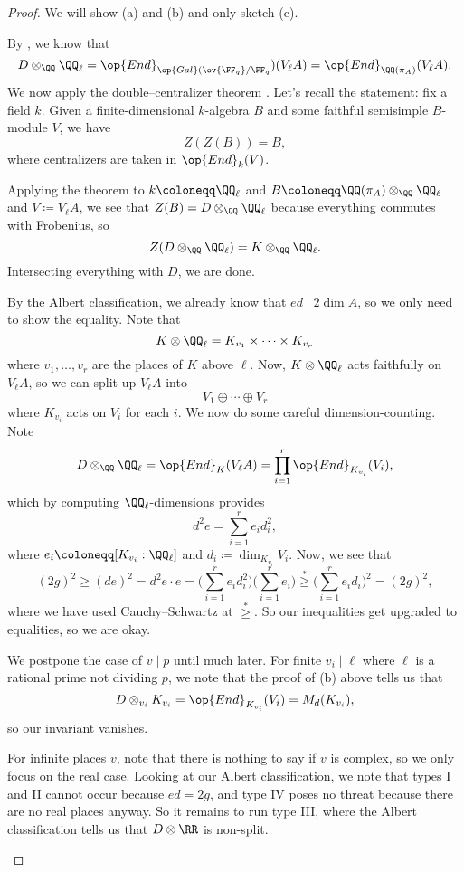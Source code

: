 \documentclass[../notes.tex]{subfiles}
\begin{document}
\begin{proof}
	We will show (a) and (b) and only sketch (c).
	\begin{listalph}
		\item By , we know that
		\[D\otimes_\QQ\QQ_\ell=\op{End}_{\op{Gal}(\ov{\FF_q}/\FF_q})(V_\ell A)=\op{End}_{\QQ(\pi_A)}(V_\ell A).\]
		We now apply the double--centralizer theorem \cite[Theorem~IV.1.14]{milne-cft}. Let's recall the statement: fix a field $k$. Given a finite-dimensional $k$-algebra $B$ and some faithful semisimple $B$-module $V$, we have
		\[Z(Z(B))=B,\]
		where centralizers are taken in $\op{End}_k(V)$.
		
		Applying the theorem to $k\coloneqq\QQ_\ell$ and $B\coloneqq\QQ(\pi_A)\otimes_\QQ\QQ_\ell$ and $V\coloneqq V_\ell A$, we see that $Z(B)=D\otimes_\QQ\QQ_\ell$ because everything commutes with Frobenius, so
		\[Z(D\otimes_\QQ\QQ_\ell)=K\otimes_\QQ\QQ_\ell.\]
		Intersecting everything with $D$, we are done.

		\item By the Albert classification, we already know that $ed\mid2\dim A$, so we only need to show the equality. Note that
		\[K\otimes\QQ_\ell=K_{v_1}\times\cdots\times K_{v_r}\]
		where $v_1,\ldots,v_r$ are the places of $K$ above $\ell$. Now, $K\otimes\QQ_\ell$ acts faithfully on $V_\ell A$, so we can split up $V_\ell A$ into
		\[V_1\oplus\cdots\oplus V_r\]
		where $K_{v_i}$ acts on $V_i$ for each $i$. We now do some careful dimension-counting. Note
		\[D\otimes_\QQ\QQ_\ell=\op{End}_K(V_\ell A)=\prod_{i=1}^r\op{End}_{K_{v_i}}(V_i),\]
		which by computing $\QQ_\ell$-dimensions provides
		\[d^2e=\sum_{i=1}^re_id_i^2,\]
		where $e_i\coloneqq[K_{v_i}:\QQ_\ell]$ and $d_i\coloneqq\dim_{K_{v_i}}V_i$. Now, we see that
		\[(2g)^2\ge(de)^2=d^2e\cdot e=\Bigg(\sum_{i=1}^re_id_i^2\Bigg)\Bigg(\sum_{i=1}^re_i\Bigg)\stackrel*\ge\Bigg(\sum_{i=1}^re_id_i\Bigg)^2=(2g)^2,\]
		where we have used Cauchy--Schwartz at $\stackrel*\ge$. So our inequalities get upgraded to equalities, so we are okay.

		\item We postpone the case of $v\mid p$ until much later. For finite $v_i\mid\ell$ where $\ell$ is a rational prime not dividing $p$, we note that the proof of (b) above tells us that
		\[D\otimes_{v_i}K_{v_i}=\op{End}_{K_{v_i}}(V_i)=M_d(K_{v_i}),\]
		so our invariant vanishes.

		For infinite places $v$, note that there is nothing to say if $v$ is complex, so we only focus on the real case. Looking at our Albert classification, we note that types I and II cannot occur because $ed=2g$, and type IV poses no threat because there are no real places anyway. So it remains to run type III, where the Albert classification tells us that $D\otimes\RR$ is non-split.%
		\qedhere
	\end{listalph}
\end{proof}
\end{document}

